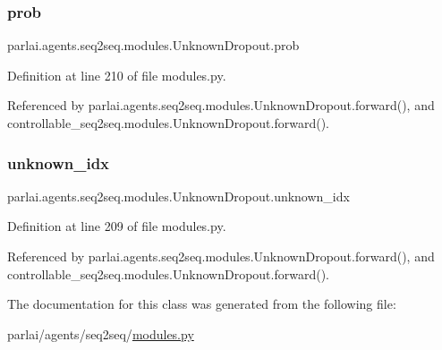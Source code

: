 \subsubsection{\texorpdfstring{prob}{prob}}
{\footnotesize\ttfamily parlai.\+agents.\+seq2seq.\+modules.\+Unknown\+Dropout.\+prob}



Definition at line 210 of file modules.\+py.



Referenced by parlai.\+agents.\+seq2seq.\+modules.\+Unknown\+Dropout.\+forward(), and controllable\+\_\+seq2seq.\+modules.\+Unknown\+Dropout.\+forward().

\mbox{\label{classparlai_1_1agents_1_1seq2seq_1_1modules_1_1UnknownDropout_aff31c992c18277c85619d257401c621a}} 
\subsubsection{\texorpdfstring{unknown\+\_\+idx}{unknown\_idx}}
{\footnotesize\ttfamily parlai.\+agents.\+seq2seq.\+modules.\+Unknown\+Dropout.\+unknown\+\_\+idx}



Definition at line 209 of file modules.\+py.



Referenced by parlai.\+agents.\+seq2seq.\+modules.\+Unknown\+Dropout.\+forward(), and controllable\+\_\+seq2seq.\+modules.\+Unknown\+Dropout.\+forward().



The documentation for this class was generated from the following file\+:\begin{DoxyCompactItemize}
\item 
parlai/agents/seq2seq/\hyperlink{parlai_2agents_2seq2seq_2modules_8py}{modules.\+py}\end{DoxyCompactItemize}

